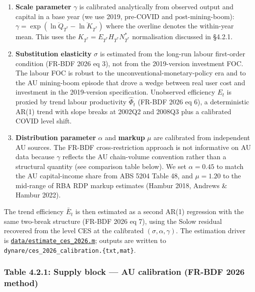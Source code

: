 \documentclass[
]{article}
\begin{document}
\begin{enumerate}
\def\labelenumi{\arabic{enumi}.}
\item
  \textbf{Scale parameter} \(\gamma\) is calibrated analytically from
  observed output and capital in a base year (we use 2019, pre-COVID and
  post-mining-boom):
  \(\gamma = \exp(\overline{\ln Q_{T^*}} - \overline{\ln K_{T^*}})\)
  where the overline denotes the within-year mean. This uses the
  \(K_{T^*} = E_{T^*} H_{T^*} N^*_{T^*}\) normalisation discussed in
  §4.2.1.
\item
  \textbf{Substitution elasticity} \(\sigma\) is estimated from the
  long-run labour first-order condition (FR-BDF 2026 eq 3), not from the
  2019-version investment FOC. The labour FOC is robust to the
  unconventional-monetary-policy era and to the AU mining-boom episode
  that drove a wedge between real user cost and investment in the
  2019-version specification. Unobserved efficiency \(E_t\) is proxied
  by trend labour productivity \(\hat{\Phi}_t\) (FR-BDF 2026 eq 6), a
  deterministic AR(1) trend with slope breaks at 2002Q2 and 2008Q3 plus
  a calibrated COVID level shift.
\item
  \textbf{Distribution parameter} \(\alpha\) and \textbf{markup} \(\mu\)
  are calibrated from independent AU sources. The FR-BDF
  cross-restriction approach is not informative on AU data because
  \(\gamma\) reflects the AU chain-volume convention rather than a
  structural quantity (see comparison table below). We set
  \(\alpha = 0.45\) to match the AU capital-income share from ABS 5204
  Table 48, and \(\mu = 1.20\) to the mid-range of RBA RDP markup
  estimates (Hambur 2018, Andrews \& Hambur 2022).
\end{enumerate}

The trend efficiency \(\bar{E}_t\) is then estimated as a second AR(1)
regression with the same two-break structure (FR-BDF 2026 eq 7), using
the Solow residual recovered from the level CES at the calibrated
\((\sigma, \alpha, \gamma)\). The estimation driver is
\href{../data/estimate_ces_2026.m}{\texttt{data/estimate\_ces\_2026.m}};
outputs are written to
\texttt{dynare/ces\_2026\_calibration.\{txt,mat\}}.

\subsubsection{Table 4.2.1: Supply block --- AU calibration (FR-BDF 2026
method)}\label{table-4.2.1-supply-block-au-calibration-fr-bdf-2026-method}
\end{document}

